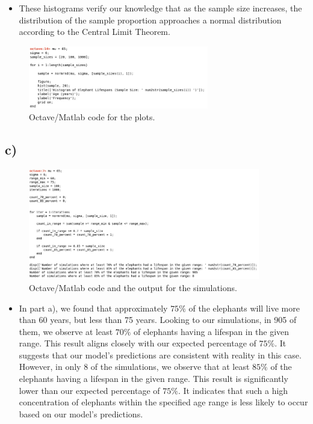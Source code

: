 \documentclass[12pt]{article}
\begin{document}
\begin{itemize}
    \item These histograms verify our knowledge that as the sample size increases, the distribution of
    the sample proportion approaches a normal distribution according to the Central Limit Theorem.
\end{itemize}

\begin{figure}[H]
    \centering
    \includegraphics[width=0.7\textwidth]{plots/octave code for the plots.jpg}
    \caption{Octave/Matlab code for the plots.}
\end{figure}

\subsection*{c)}
\begin{figure}[H]
    \centering
    \includegraphics[width=0.9\textwidth]{plots/4c code output.jpg}
    \caption{Octave/Matlab code and the output for the simulations.}
\end{figure}

\begin{itemize}
    \item In part a), we found that approximately $75\%$ of the elephants will live more than 60 years, but less than 75 years. Looking to our simulations, in 905 of them, we observe at least $70\%$ of elephants having a lifespan in the given range. This result aligns closely with our expected percentage of $75\%$. It suggests that our model's predictions are consistent with reality in this case. However, in only 8 of the simulations, we observe that at least $85\%$ of the elephants having a lifespan in the given range. This result is significantly lower than our expected percentage of $75\%$. It indicates that such a high concentration of elephants within the specified age range is less likely to occur based on our model's predictions.
\end{itemize}
\end{document}
